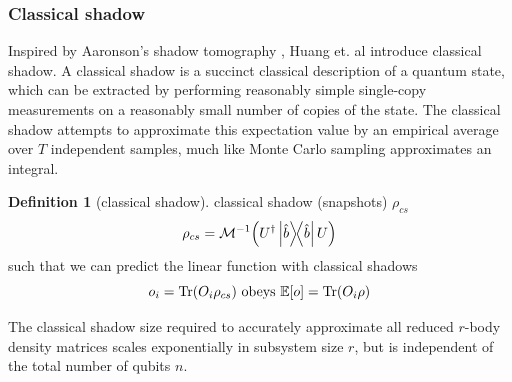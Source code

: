 \documentclass[
10pt,
aps,
pra,
linenumbers,
floatfix,
]{revtex4-2}
\theoremstyle{plain}
\theoremstyle{definition}
\newtheorem{definition}{Definition}
\newtheorem{remark}{Remark}
\newcommand{\dm}{\rho}
\begin{document}
\subsubsection{Classical shadow}\label{sec:classical_shadow}
Inspired by Aaronson's shadow tomography \cite{aaronsonShadowTomographyQuantum2018}, Huang et. al \cite{huangPredictingManyProperties2020} introduce classical shadow.
A classical shadow is a succinct classical description of a quantum state, which can be extracted by performing reasonably simple single-copy measurements on a reasonably small number of copies of the state.
The classical shadow attempts to approximate this expectation value by an empirical average over $T$ independent samples, much like Monte Carlo sampling approximates an integral.
\begin{definition}[classical shadow]\label{def:classical_shadow}
	classical shadow (snapshots) $\dm_{cs}$
	\begin{equation}
		\dm_{cs} = \mathcal{M}^{-1} \qty(U^\dagger \op{\hat{b}} U)
	\end{equation}
	such that we can predict the linear function with classical shadows
	\begin{equation}
		o_i = \Tr(O_i \dm_{cs})
		\text{ obeys }
		\expectation[o] =\Tr(O_i \dm)
	\end{equation}
\end{definition}
The classical shadow size required to accurately approximate all reduced $r$-body density matrices scales exponentially in subsystem size $r$, but is independent of the total number of qubits $n$.
\end{document}
